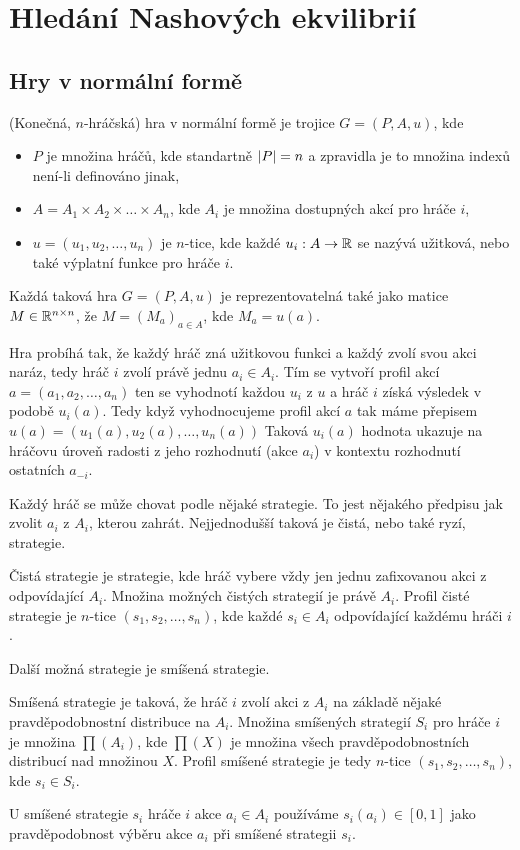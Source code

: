 \section{Hledání Nashových ekvilibrií}
\subsection{Hry v normální formě}
\begin{definition}
\label{def:normal_form_game}
(Konečná, $n$-hráčská) hra v normální formě je trojice $G = (P, A, u)$, kde 
\begin{itemize}
    \item $P$ je množina hráčů, kde standartně $\left|P\right| = n$ a zpravidla je to množina indexů není-li definováno jinak,
    \item $A = A_1 \times A_2 \times \dots \times A_n$, kde $A_i$ je množina dostupných akcí pro hráče $i$,\item $u = (u_1, u_2, \dots, u_n)$ je $n$-tice, kde každé $u_i: A \rightarrow \mathbb{R}$ se nazývá užitková, nebo také výplatní funkce pro hráče $i$.
\end{itemize}
Každá taková hra $G = (P,A,u)$ je reprezentovatelná také jako matice $M \in \mathbb{R}^{n \times n}$, že $M = (M_a)_{a\in A}$, kde $M_a = u(a)$.
\end{definition}
Hra probíhá tak, že každý hráč zná užitkovou funkci a každý zvolí svou akci naráz, tedy hráč $i$ zvolí právě jednu $a_i \in A_i$. 
Tím se vytvoří profil akcí $a = (a_1, a_2, \dots, a_n)$ ten se vyhodnotí každou $u_i$ z $u$ a hráč $i$ získá výsledek v podobě $u_i(a)$. 
Tedy když vyhodnocujeme profil akcí $a$ tak máme přepisem $u(a) = (u_1(a), u_2(a), \dots, u_n(a))$
Taková $u_i(a)$ hodnota ukazuje na hráčovu úroveň radosti z jeho rozhodnutí (akce $a_i$) v kontextu rozhodnutí ostatních $a_{-i}$. 

Každý hráč se může chovat podle nějaké strategie. To jest nějakého předpisu jak zvolit $a_i$ z $A_i$, kterou zahrát. Nejjednodušší taková je čistá, nebo také ryzí, strategie.
\begin{definition}
\label{def:pure_strategy}
Čistá strategie je strategie, kde hráč vybere vždy jen jednu zafixovanou akci z odpovídající $A_i$. Množina možných čistých strategií je právě $A_i$. Profil čisté strategie je $n$-tice $(s_1, s_2, \dots, s_n)$, kde každé $s_i \in A_i$ odpovídající každému hráči $i$.
\end{definition}
Další možná strategie je smíšená strategie. 
\begin{definition}
\label{def:mixed_strategy}
Smíšená strategie je taková, že hráč $i$ zvolí akci z $A_i$ na základě nějaké pravděpodobnostní distribuce na $A_i$. Množina smíšených strategií $S_i$ pro hráče $i$ je množina $\prod (A_i)$, kde $\prod(X)$ je množina všech pravděpodobnostních distribucí nad množinou $X$. Profil smíšené strategie je tedy $n$-tice $(s_1, s_2, \dots, s_n)$, kde $s_i \in S_i$. 
\end{definition}
U smíšené strategie $s_i$ hráče $i$ akce $a_i \in A_i$ používáme $s_i(a_i) \in [0,1]$ jako pravděpodobnost výběru akce $a_i$ při smíšené strategii $s_i$. 

